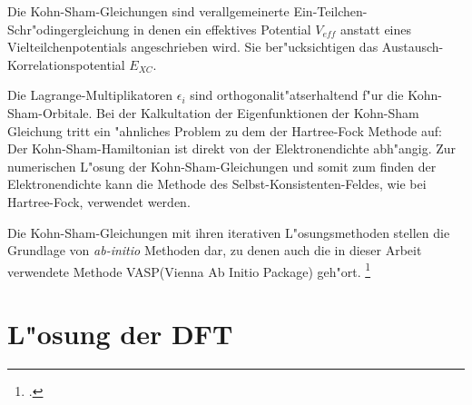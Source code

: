 Die Kohn-Sham-Gleichungen sind verallgemeinerte Ein-Teilchen-Schr"odingergleichung in denen ein effektives Potential $V_{eff}$ anstatt eines Vielteilchenpotentials angeschrieben wird. Sie ber"ucksichtigen das Austausch-Korrelationspotential $E_{XC}$. 

Die Lagrange-Multiplikatoren $\epsilon_i$ sind orthogonalit"atserhaltend f"ur die Kohn-Sham-Orbitale. Bei der Kalkultation der Eigenfunktionen der Kohn-Sham Gleichung tritt ein "ahnliches Problem zu dem der Hartree-Fock Methode auf: Der Kohn-Sham-Hamiltonian ist direkt von der Elektronendichte abh"angig. Zur numerischen L"osung der Kohn-Sham-Gleichungen und somit zum finden der Elektronendichte kann die Methode des Selbst-Konsistenten-Feldes, wie bei Hartree-Fock, verwendet werden. 

Die Kohn-Sham-Gleichungen mit ihren iterativen L"osungsmethoden stellen die Grundlage von \textit{ab-initio} Methoden dar, zu denen auch die in dieser Arbeit verwendete Methode VASP(Vienna Ab Initio Package) geh"ort. \footcite[161]{fk2}





\section{L"osung der DFT}


